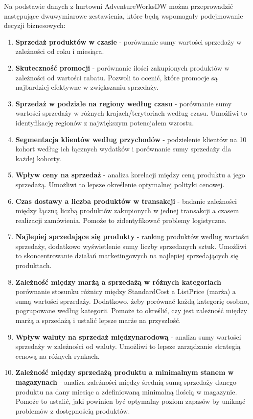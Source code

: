 \documentclass[a4paper,12pt]{article}
\begin{document}
Na podstawie danych z hurtowni AdventureWorksDW można przeprowadzić następujące dwuwymiarowe zestawienia, które będą wspomagały podejmowanie decyzji biznesowych:

\begin{enumerate}
      \item \textbf{Sprzedaż produktów w czasie} - porównanie sumy wartości sprzedaży w zależności od roku i miesiąca.
      \item \textbf{Skuteczność promocji} - porównanie ilości zakupionych produktów w zależności od wartości rabatu.
            Pozwoli to ocenić, które promocje są najbardziej efektywne w zwiększaniu sprzedaży.
      \item \textbf{Sprzedaż w podziale na regiony według czasu} - porównanie sumy wartości sprzedaży w różnych krajach/terytoriach według czasu.
            Umożliwi to identyfikację regionów z największym potencjałem wzrostu.
      \item \textbf{Segmentacja klientów według przychodów} - podzielenie klientów na 10 kohort według ich łącznych wydatków i porównanie sumy sprzedaży dla każdej kohorty.
      \item \textbf{Wpływ ceny na sprzedaż} - analiza korelacji między ceną produktu a jego sprzedażą.
            Umożliwi to lepsze określenie optymalnej polityki cenowej.
      \item \textbf{Czas dostawy a liczba produktów w transakcji} - badanie zależności między łączną liczbą produktów zakupionych w jednej transakcji a czasem realizacji zamówienia.
            Pomoże to zidentyfikować problemy logistyczne.
      \item \textbf{Najlepiej sprzedające się produkty} - ranking produktów według wartości sprzedaży, dodatkowo wyświetlenie sumy liczby sprzedanych sztuk.
            Umożliwi to skoncentrowanie działań marketingowych na najlepiej sprzedających się produktach.
      \item \textbf{Zależność między marżą a sprzedażą w różnych kategoriach} - porównanie stosunku różnicy między StandardCost a ListPrice (marża) a sumą wartości sprzedaży. Dodatkowo, żeby porównać każdą kategorię osobno, pogrupowane według kategorii.
            Pomoże to określić, czy jest zależność między marżą a sprzedażą i ustalić lepsze marże na przyszłość.
      \item \textbf{Wpływ waluty na sprzedaż międzynarodową} - analiza sumy wartości sprzedaży w zależności od waluty.
            Umożliwi to lepsze zarządzanie strategią cenową na różnych rynkach.
      \item \textbf{Zależność między sprzedażą produktu a minimalnym stanem w magazynach} - analiza zależności między średnią sumą sprzedaży danego produktu na dany miesiąc a zdefiniowaną minimalną ilością w magazynie.
            Pomoże to ustalić, jaki powinien być optymalny poziom zapasów by uniknąć problemów z dostępnością produktów.
\end{enumerate}
\end{document}
